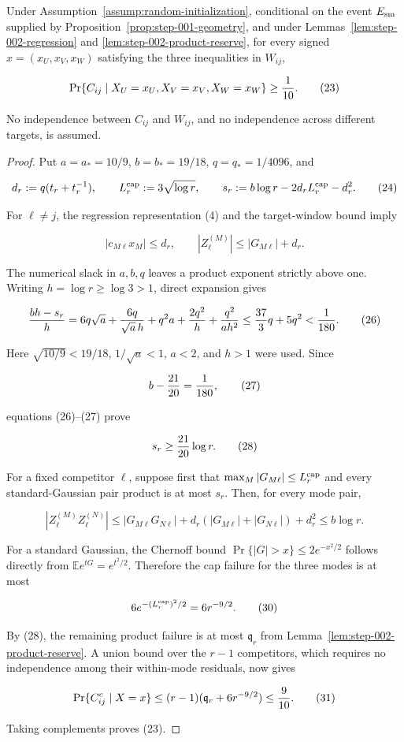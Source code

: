 \begin{proposition}\label{prop:step-002-conditional-competitors}
Under Assumption~\ref{assump:random-initialization}, conditional on the
event $E_{\rm sm}$ supplied by Proposition~\ref{prop:step-001-geometry},
and under Lemmas~\ref{lem:step-002-regression} and
\ref{lem:step-002-product-reserve}, for every signed
$x=(x_U,x_V,x_W)$ satisfying the three inequalities in $W_{ij}$,

\[
\Pr\{C_{ij}\mid X_U=x_U,X_V=x_V,X_W=x_W\}\ge {1\over10}.
\tag{23}
\]

No independence between $C_{ij}$ and $W_{ij}$, and no independence across
different targets, is assumed.

\begin{proof}
Put $a=a_*=10/9$, $b=b_*=19/18$, $q=q_*=1/4096$, and

\[
d_r:=q(t_r+t_r^{-1}),\qquad
L_r^{\rm cap}:=3\sqrt{\log r},\qquad
s_r:=b\log r-2d_rL_r^{\rm cap}-d_r^2.
\tag{24}
\]

For $\ell\ne j$, the regression representation (4) and the target-window
bound imply

\[
|c_{M\ell}x_M|\le d_r,\qquad
|Z_{\ell}^{(M)}|\le |G_{M\ell}|+d_r.
\tag{25}
\]

The numerical slack in $a,b,q$ leaves a product exponent strictly above one.
Writing $h=\log r\ge\log3>1$, direct expansion gives

\[
{b h-s_r\over h}
=6q\sqrt a+{6q\over\sqrt a\,h}
+q^2a+{2q^2\over h}+{q^2\over a h^2}
\le {37\over3}q+5q^2<{1\over180}.
\tag{26}
\]

Here $\sqrt{10/9}<19/18$, $1/\sqrt a<1$, $a<2$, and $h>1$ were
used. Since

\[
b-{21\over20}={1\over180},
\tag{27}
\]

equations (26)--(27) prove

\[
s_r\ge {21\over20}\log r.
\tag{28}
\]

For a fixed competitor $\ell$, suppose first that
$\max_M|G_{M\ell}|\le L_r^{\rm cap}$ and every standard-Gaussian pair
product is at most $s_r$. Then, for every mode pair,

\[
|Z_{\ell}^{(M)}Z_{\ell}^{(N)}|
\le |G_{M\ell}G_{N\ell}|
+d_r(|G_{M\ell}|+|G_{N\ell}|)+d_r^2
\le b\log r.
\tag{29}
\]

For a standard Gaussian, the Chernoff bound
$\Pr\{|G|>x\}\le2e^{-x^2/2}$ follows directly from
$\mathbb Ee^{tG}=e^{t^2/2}$. Therefore the cap failure for the three
modes is at most

\[
6e^{-(L_r^{\rm cap})^2/2}=6r^{-9/2}.
\tag{30}
\]

By (28), the remaining product failure is at most $\mathfrak q_r$ from
Lemma~\ref{lem:step-002-product-reserve}. A union bound over the $r-1$
competitors, which requires no independence among their within-mode
residuals, now gives

\[
\Pr\{C_{ij}^c\mid X=x\}
\le(r-1)(\mathfrak q_r+6r^{-9/2})
\le {9\over10}.
\tag{31}
\]

Taking complements proves (23). 


\end{proof}
\end{proposition}
